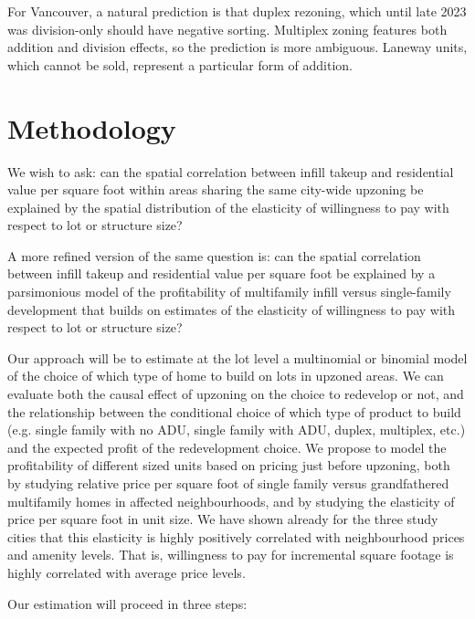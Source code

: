 \documentclass[12pt]{article}
\begin{document}
For Vancouver, a natural prediction is that duplex rezoning, which until late
2023 was division-only should have negative sorting. Multiplex zoning features
both addition and division effects, so the prediction is more ambiguous.
Laneway units, which cannot be sold, represent a particular form of addition. 

\section{Methodology}

We wish to ask: can the spatial correlation between infill takeup and
residential value per square foot within areas sharing the same city-wide upzoning
be explained by the spatial distribution of the elasticity of willingness to
pay with respect to lot or structure size? 

A more refined version of the same question is: can the spatial correlation
between infill takeup and residential value per square foot be explained by a
parsimonious model of the profitability of multifamily infill versus
single-family development that builds on estimates of the elasticity of
willingness to pay with respect to lot or structure size?

Our approach will be to estimate at the lot level a multinomial or binomial
model of the choice of which type of home to build on lots in upzoned areas. We
can evaluate both the causal effect of upzoning on the choice to redevelop or
not, and the relationship between the conditional choice of which type of
product to build (e.g. single family with no ADU, single family with ADU,
duplex, multiplex, etc.) and the expected profit of the redevelopment choice.
We propose to model the profitability of different sized units based on pricing
just before upzoning, both by studying relative price per square foot of single
family versus grandfathered multifamily homes in affected neighbourhoods, and
by studying the elasticity of price per square foot in unit size. We have shown
already for the three study cities that this elasticity is highly positively
correlated with neighbourhood prices and amenity levels. That is, willingness
to pay for incremental square footage is highly correlated with average price
levels.

Our estimation will proceed in three steps:
\end{document}
